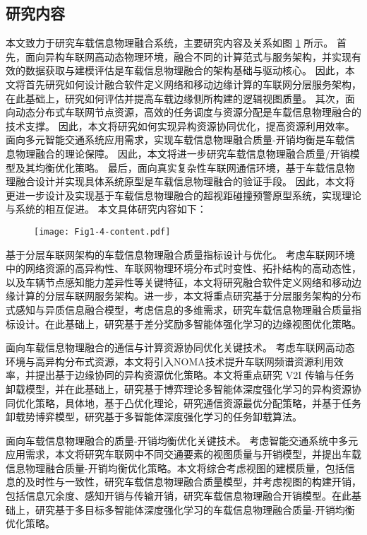 \subsection{研究内容}

本文致力于研究车载信息物理融合系统，主要研究内容及关系如图 \ref{fig 1-4} 所示。
首先，面向异构车联网高动态物理环境，融合不同的计算范式与服务架构，并实现有效的数据获取与建模评估是车载信息物理融合的架构基础与驱动核心。
因此，本文将首先研究如何设计融合软件定义网络和移动边缘计算的车联网分层服务架构，在此基础上，研究如何评估并提高车载边缘侧所构建的逻辑视图质量。
其次，面向动态分布式车联网节点资源，高效的任务调度与资源分配是车载信息物理融合的技术支撑。
因此，本文将研究如何实现异构资源协同优化，提高资源利用效率。
面向多元智能交通系统应用需求，实现车载信息物理融合质量-开销均衡是车载信息物理融合的理论保障。
因此，本文将进一步研究车载信息物理融合质量/开销模型及其均衡优化策略。
最后，面向真实复杂性车联网通信环境，基于车载信息物理融合设计并实现具体系统原型是车载信息物理融合的验证手段。
因此，本文将更进一步设计及实现基于车载信息物理融合的超视距碰撞预警原型系统，实现理论与系统的相互促进。
本文具体研究内容如下：

\begin{figure}[h] 
	\centering
	\texttt{[image: Fig1-4-content.pdf]}
	\label{fig 1-4}
\end{figure}

 基于分层车联网架构的车载信息物理融合质量指标设计与优化。
考虑车联网环境中的网络资源的高异构性、车联网物理环境分布式时变性、拓扑结构的高动态性，以及车辆节点感知能力差异性等关键特征，本文将研究融合软件定义网络和移动边缘计算的分层车联网服务架构。进一步，本文将重点研究基于分层服务架构的分布式感知与异质信息融合模型，考虑信息的多维需求，研究车载信息物理融合质量指标设计。在此基础上，研究基于差分奖励多智能体强化学习的边缘视图优化策略。

 面向车载信息物理融合的通信与计算资源协同优化关键技术。
考虑车联网高动态环境与高异构分布式资源，本文将引入NOMA技术提升车联网频谱资源利用效率，并提出基于边缘协同的异构资源优化策略。本文将重点研究 V2I 传输与任务卸载模型，并在此基础上，研究基于博弈理论多智能体深度强化学习的异构资源协同优化策略，具体地，基于凸优化理论，研究通信资源最优分配策略，并基于任务卸载势博弈模型，研究基于多智能体深度强化学习的任务卸载算法。

 面向车载信息物理融合的质量-开销均衡优化关键技术。
考虑智能交通系统中多元应用需求，本文将研究车联网中不同交通要素的视图质量与开销模型，并提出车载信息物理融合质量-开销均衡优化策略。本文将综合考虑视图的建模质量，包括信息的及时性与一致性，研究车载信息物理融合质量模型，并考虑视图的构建开销，包括信息冗余度、感知开销与传输开销，研究车载信息物理融合开销模型。在此基础上，研究基于多目标多智能体深度强化学习的车载信息物理融合质量-开销均衡优化策略。

